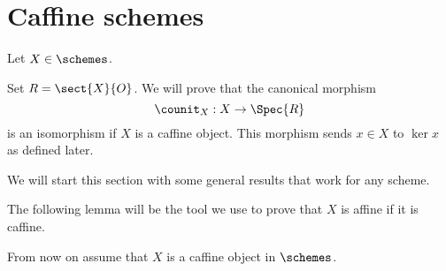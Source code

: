 \section{Caffine schemes}

Let $X\in \schemes$.

Set $R = \sect{X}{O}$.
We will prove that the canonical morphism \[\counit_X: X \rightarrow \Spec{R}\] is an isomorphism if $X$ is a caffine object.
This morphism sends $x\in X$ to $\ker{x}$ as defined later.

We will start this section with some general results that work for any scheme.





The following lemma will be the tool we use to prove that $X$ is affine if it is caffine.






From now on assume that $X$ is a caffine object in $\schemes$.






